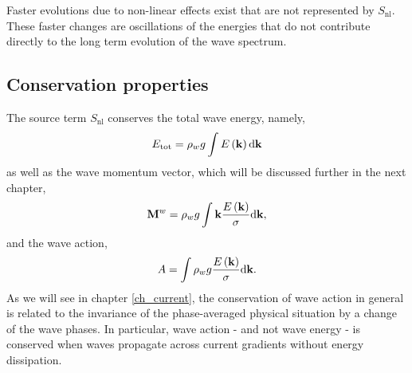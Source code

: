 Faster evolutions due to non-linear effects exist that are not represented by $S_{\mathrm{nl}}$. These faster changes are oscillations of the energies that 
do not contribute directly to the long term evolution of the wave spectrum. 

\subsection{Conservation properties}
The source term $S_{\mathrm{nl}}$ conserves the total wave energy, namely, 
\begin{equation}
E_{\mathrm{tot}}=\rho_w g \int E\left(\mathbf{k}\right){\mathrm d}\mathbf{k}
\end{equation}
as well as the wave momentum vector, which will be discussed further in the next chapter, 
\begin{equation}
\mathbf M^w=\rho_w g  \int
\mathbf{k} \frac{E\left(\mathbf{k}\right)}{\sigma} {\mathrm d}{\mathbf
k},
\end{equation}
and the wave action, 
\begin{equation}
A=\int  \rho_w g \frac{E\left(\mathbf{k}\right)}{\sigma}
{\mathrm d}\mathbf{k}.
\end{equation}
As we will see in chapter \ref{ch_current}, the conservation of wave action in general is related to the invariance of the phase-averaged physical situation by 
a change of the wave phases. In particular, wave action - and not wave energy - is conserved when waves propagate across current gradients without energy dissipation. 

